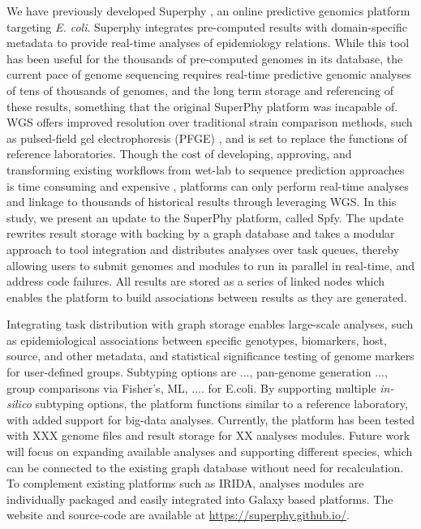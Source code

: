 \documentclass[a4,center,fleqn]{NAR}
\begin{document}
We have previously developed Superphy \cite{whiteside2016superphy}, an online predictive genomics platform targeting \textit{E. coli}.
Superphy integrates pre-computed results with domain-specific metadata to provide real-time analyses of epidemiology relations.
While this tool has been useful for the thousands of pre-computed genomes in its database, the current pace of genome sequencing requires real-time predictive genomic analyses of tens of thousands of genomes, and the long term storage and referencing of these results, something that the original SuperPhy platform was incapable of.
WGS offers improved resolution over traditional strain comparison methods, such as  pulsed-field gel electrophoresis (PFGE) \cite{ronholm2016navigating}, and is set to replace the functions of reference laboratories.
Though the cost of developing, approving, and transforming existing workflows from wet-lab to sequence prediction approaches is time consuming and expensive \cite{koser2012routine}, platforms can only perform real-time analyses and linkage to thousands of historical results through leveraging WGS.
In this study, we present an update to the SuperPhy platform, called Spfy.
The update rewrites result storage with backing by a graph database and takes a modular approach to tool integration and distributes analyses over task queues, thereby allowing users to submit genomes and modules to run in parallel in real-time, and address code failures.
All results are stored as a series of linked nodes which enables the platform to build associations between results as they are generated. \par

Integrating task distribution with graph storage enables large-scale analyses, such as epidemiological associations between specific genotypes, biomarkers, host, source, and other metadata, and statistical significance testing of genome markers for user-defined groups.
Subtyping options are ..., pan-genome generation ..., group comparisons via Fisher's, ML, .... for E.coli.
By supporting multiple \textit{in-silico} subtyping options, the platform functions similar to a reference laboratory, with added support for big-data analyses.
Currently, the platform has been tested with XXX genome files and result storage for XX analyses modules.
Future work will focus on expanding available analyses and supporting different species, which can be connected to the existing graph database without need for recalculation.
To complement existing platforms such as IRIDA, analyses modules are individually packaged and easily integrated into Galaxy \cite{goecks2010galaxy} based platforms.
The website and source-code are available at \url{https://superphy.github.io/}. \par
\end{document}
